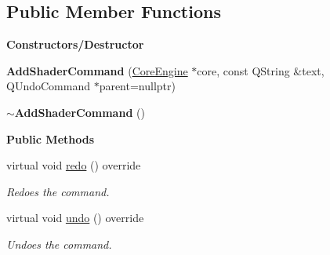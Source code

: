 \subsection*{Public Member Functions}
\begin{Indent}\textbf{ Constructors/\+Destructor}\par
\begin{DoxyCompactItemize}
\item 
\mbox{\label{classrev_1_1_add_shader_command_a811884bacf80a763de62025f08537106}} 
{\bfseries Add\+Shader\+Command} (\mbox{\hyperlink{classrev_1_1_core_engine}{Core\+Engine}} $\ast$core, const Q\+String \&text, Q\+Undo\+Command $\ast$parent=nullptr)
\item 
\mbox{\label{classrev_1_1_add_shader_command_a0960ade9c414b9fd7a1fb716adbe2f8e}} 
{\bfseries $\sim$\+Add\+Shader\+Command} ()
\end{DoxyCompactItemize}
\end{Indent}
\begin{Indent}\textbf{ Public Methods}\par
\begin{DoxyCompactItemize}
\item 
\mbox{\label{classrev_1_1_add_shader_command_a0e7bbdad5644ce7e7bedb5176e81253d}} 
virtual void \mbox{\hyperlink{classrev_1_1_add_shader_command_a0e7bbdad5644ce7e7bedb5176e81253d}{redo}} () override
\begin{DoxyCompactList}\small\item\em Redoes the command. \end{DoxyCompactList}\item 
\mbox{\label{classrev_1_1_add_shader_command_ad577a61b454f9e1a06f81e01ce6c2b76}} 
virtual void \mbox{\hyperlink{classrev_1_1_add_shader_command_ad577a61b454f9e1a06f81e01ce6c2b76}{undo}} () override
\begin{DoxyCompactList}\small\item\em Undoes the command. \end{DoxyCompactList}\end{DoxyCompactItemize}
\end{Indent}
